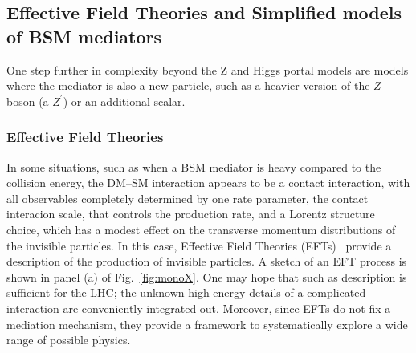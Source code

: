 

\subsection{Effective Field Theories and Simplified models of BSM mediators}
\label{sec:BSMMediatorModels}

One step further in complexity beyond the Z and Higgs portal models are models where the mediator is also a new particle, such as a heavier version of the $Z$ boson (a $Z^\prime$) or an additional scalar.






\subsubsection{Effective Field Theories}
\label{sub:EFT}


In some situations, such as when a BSM mediator is heavy compared to the collision energy, the DM--SM interaction appears to be a contact interaction, with all observables completely determined by one rate parameter, the contact interacion scale, that controls the production rate, and a Lorentz structure choice, which has a modest effect on the transverse momentum distributions of the invisible particles.
In this case, Effective Field Theories (EFTs)~\cite{Goodman:2010ku,Bai:2010hh,Fox:2011pm} provide a description of the production of invisible particles.
A sketch of an EFT process is shown in panel (a) of Fig.~\ref{fig:monoX}.
One may hope that such as description is sufficient for the LHC; the unknown high-energy details of a complicated interaction are conveniently integrated out.
Moreover, since EFTs do not fix a mediation mechanism, they provide a framework to systematically explore a wide range of possible physics.

